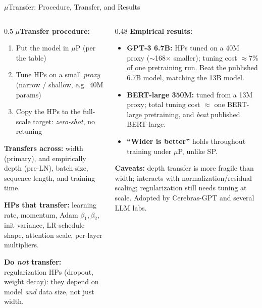\begin{frame}{$\mu$Transfer: Procedure, Transfer, and Results}

  \begin{columns}[T]
    \begin{column}{0.5\textwidth}
      \textbf{$\mu$Transfer procedure:}
      \begin{enumerate}
        \item Put the model in $\mu$P (per the table)
        \item Tune HPs on a small \emph{proxy} (narrow / shallow, e.g.\ 40M params)
        \item Copy the HPs to the full-scale target: \emph{zero-shot}, no retuning
      \end{enumerate}

      \vspace{0.3em}
      \textbf{Transfers across:} width (primary), and empirically depth (pre-LN), batch size, sequence length, and training time.

      \vspace{0.3em}
      \textbf{HPs that transfer:} learning rate, momentum, Adam $\beta_1,\beta_2$, init variance, LR-schedule shape, attention scale, per-layer multipliers.

      \vspace{0.2em}
      \textbf{Do \emph{not} transfer:} regularization HPs (dropout, weight decay): they depend on model \emph{and} data size, not just width.
    \end{column}
    \begin{column}{0.48\textwidth}
      \textbf{Empirical results:}
      \begin{itemize}
        \item \textbf{GPT-3 6.7B:} HPs tuned on a 40M proxy ($\sim$168$\times$ smaller); tuning cost $\approx$7\% of one pretraining run. Beat the published 6.7B model, matching the 13B model.
        \item \textbf{BERT-large 350M:} tuned from a 13M proxy; total tuning cost $\approx$ one BERT-large pretraining, and \emph{beat} published BERT-large.
        \item \textbf{``Wider is better''} holds throughout training under $\mu$P, unlike SP.
      \end{itemize}

      \vspace{0.3em}
      \textbf{Caveats:} depth transfer is more fragile than width; interacts with normalization/residual scaling; regularization still needs tuning at scale. Adopted by Cerebras-GPT and several LLM labs.
    \end{column}
  \end{columns}
\end{frame}

